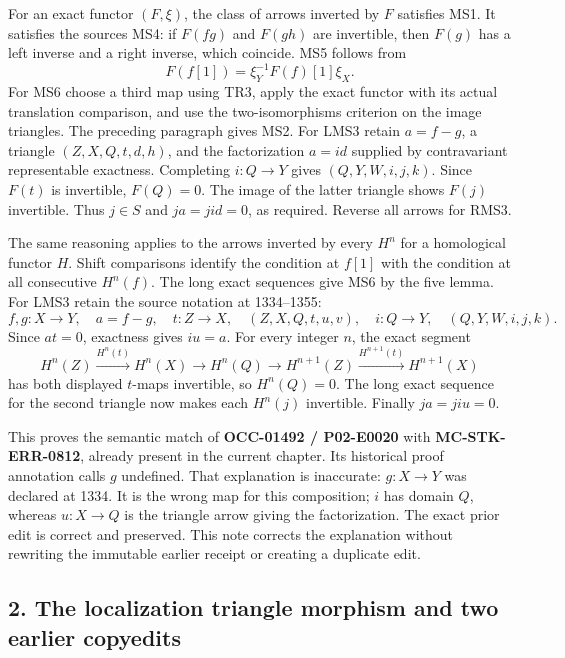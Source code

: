 \documentclass[11pt]{article}
\begin{document}
For an exact functor \((F,\xi)\),\allowbreak{} the class of arrows inverted by \(F\) satisfies MS1. It satisfies the source\textquotesingle s MS4:\allowbreak{} if \(F(fg)\) and \(F(gh)\) are invertible,\allowbreak{} then \(F(g)\) has a left inverse and a right inverse,\allowbreak{} which coincide. MS5 follows from \[
F(f[1])=\xi_Y^{-1}F(f)[1]\xi_X.
\] For MS6 choose a third map using TR3,\allowbreak{} apply the exact functor with its actual translation comparison,\allowbreak{} and use the two-isomorphisms criterion on the image triangles. The preceding paragraph gives MS2. For LMS3 retain \(a=f-g\),\allowbreak{} a triangle \((Z,X,Q,t,d,h)\),\allowbreak{} and the factorization \(a=id\) supplied by contravariant representable exactness. Completing \(i:Q\to Y\) gives \((Q,Y,W,i,j,k)\). Since \(F(t)\) is invertible,\allowbreak{} \(F(Q)=0\). The image of the latter triangle shows \(F(j)\) invertible. Thus \(j\in S\) and \(ja=jid=0\),\allowbreak{} as required. Reverse all arrows for RMS3.

The same reasoning applies to the arrows inverted by every \(H^n\) for a homological functor \(H\). Shift comparisons identify the condition at \(f[1]\) with the condition at all consecutive \(H^n(f)\). The long exact sequences give MS6 by the five lemma. For LMS3 retain the source notation at 1334–\allowbreak{}1355:\allowbreak{} \[
f,g:X\to Y,\quad a=f-g,\quad t:Z\to X,\quad
(Z,X,Q,t,u,v),\quad i:Q\to Y,\quad (Q,Y,W,i,j,k).
\] Since \(at=0\),\allowbreak{} exactness gives \textbf{\(iu=a\)}. For every integer \(n\),\allowbreak{} the exact segment \[
H^n(Z)\xrightarrow{H^n(t)}H^n(X)\longrightarrow H^n(Q)
\longrightarrow H^{n+1}(Z)\xrightarrow{H^{n+1}(t)}H^{n+1}(X)
\] has both displayed \(t\)-maps invertible,\allowbreak{} so \(H^n(Q)=0\). The long exact sequence for the second triangle now makes each \(H^n(j)\) invertible. Finally \(ja=jiu=0\).

This proves the semantic match of \textbf{OCC-01492 /\allowbreak{} P02-E0020} with \textbf{MC-STK-ERR-0812},\allowbreak{} already present in the current chapter. Its historical proof annotation calls \(g\) undefined. That explanation is inaccurate:\allowbreak{} \(g:X\to Y\) was declared at 1334. It is the wrong map for this composition; \(i\) has domain \(Q\),\allowbreak{} whereas \(u:X\to Q\) is the triangle arrow giving the factorization. The exact prior edit is correct and preserved. This note corrects the explanation without rewriting the immutable earlier receipt or creating a duplicate edit.

\subsection{2. The localization triangle morphism and two earlier copyedits}\label{proofs-1149-1843-the-localization-triangle-morphism-and-two-earlier-copyedits}
\end{document}
